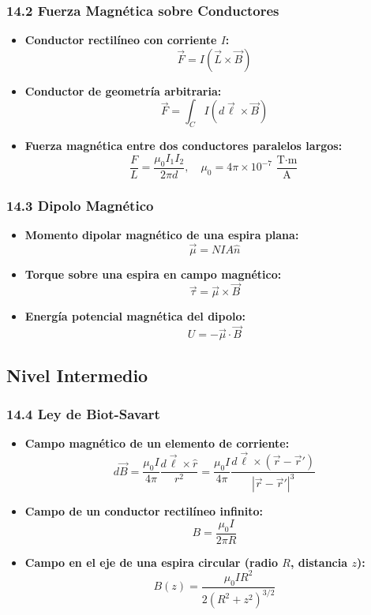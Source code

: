 \documentclass[11pt,a4paper]{article}
\begin{document}
\subsubsection*{14.2 Fuerza Magnética sobre Conductores}

\begin{itemize}
  \item \textbf{Conductor rectilíneo con corriente $I$:}
  \[
    \vec{F} = I (\vec{L} \times \vec{B})
  \]
  \item \textbf{Conductor de geometría arbitraria:}
  \[
    \vec{F} = \int_C I (d\vec{\ell} \times \vec{B})
  \]
  \item \textbf{Fuerza magnética entre dos conductores paralelos largos:}
  \[
    \frac{F}{L} = \frac{\mu_0 I_1 I_2}{2\pi d}, \quad \mu_0 = 4\pi \times 10^{-7} \, \frac{\text{T}\cdot\text{m}}{\text{A}}
  \]
\end{itemize}

\subsubsection*{14.3 Dipolo Magnético}

\begin{itemize}
  \item \textbf{Momento dipolar magnético de una espira plana:}
  \[
    \vec{\mu} = N I A \hat{n}
  \]
  \item \textbf{Torque sobre una espira en campo magnético:}
  \[
    \vec{\tau} = \vec{\mu} \times \vec{B}
  \]
  \item \textbf{Energía potencial magnética del dipolo:}
  \[
    U = -\vec{\mu} \cdot \vec{B}
  \]
\end{itemize}

\subsection*{Nivel Intermedio}

\subsubsection*{14.4 Ley de Biot-Savart}

\begin{itemize}
  \item \textbf{Campo magnético de un elemento de corriente:}
  \[
    d\vec{B} = \frac{\mu_0 I}{4\pi} \frac{d\vec{\ell} \times \hat{r}}{r^2} = \frac{\mu_0 I}{4\pi} \frac{d\vec{\ell} \times (\vec{r} - \vec{r}')}{|\vec{r} - \vec{r}'|^3}
  \]
  \item \textbf{Campo de un conductor rectilíneo infinito:}
  \[
    B = \frac{\mu_0 I}{2\pi R}
  \]
  \item \textbf{Campo en el eje de una espira circular (radio $R$, distancia $z$):}
  \[
    B(z) = \frac{\mu_0 I R^2}{2(R^2 + z^2)^{3/2}}
  \]
\end{itemize}
\end{document}
